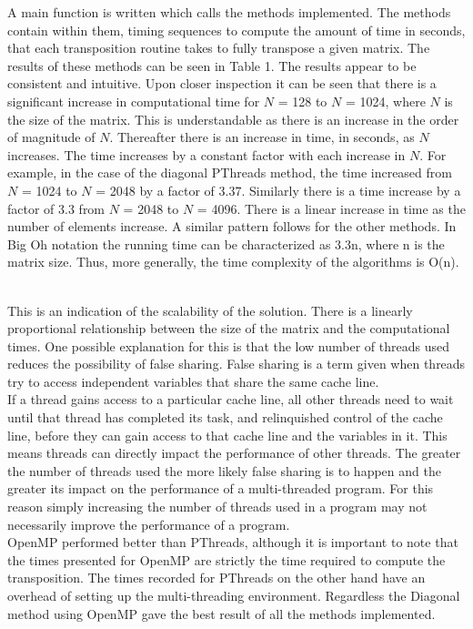 \documentclass[a4paper, 11pt, onecolumn, conference]{IEEEtran}      %
\begin{document}
A main function is written which calls the methods implemented. The methods contain within them, timing sequences to compute the amount of time in seconds, that each transposition routine takes to fully transpose a given matrix. The results of these methods can be seen in Table 1. The results appear to be consistent and intuitive. Upon closer inspection it can be seen that there is a significant increase in computational time for $N$ = 128 to $N$ = 1024, where $N$ is the size of the matrix. This is understandable as there is an increase in the order of magnitude of $N$. Thereafter there is an increase in time, in seconds, as $N$ increases. The time increases by a constant factor with each increase in $N$. For example, in the case of the diagonal PThreads method, the time increased from $N$ = 1024 to $N$ = 2048 by a factor of 3.37. Similarly there is a time increase by a factor of 3.3 from $N$ = 2048 to $N$ = 4096. There is a linear increase in time as the number of elements increase. A similar pattern follows for the other methods. In Big Oh notation the running time can be characterized as 3.3n, where n is the matrix size. Thus, more generally, the time complexity of the algorithms is O(n). \

This is an indication of the scalability of the solution. There is a linearly proportional relationship between the size of the matrix and the computational times. One possible explanation for this is that the low number of threads used reduces the possibility of false sharing. False sharing is a term given when threads try to access independent variables that share the same cache line\cite{thompson_2011}.\\

If a thread gains access to a particular cache line, all other threads need to wait until that thread has completed its task, and relinquished control of the cache line, before they can gain access to that cache line and the variables in it. This means threads can directly impact the performance of other threads. The greater the number of threads used the more likely false sharing is to happen and the greater its impact on the performance of a multi-threaded program. For this reason simply increasing the number of threads used in a program may not necessarily improve the performance of a program.\\

OpenMP performed better than PThreads, although it is important to note that the times presented for OpenMP are strictly the time required to compute the transposition. The times recorded for PThreads on the other hand have an overhead of setting up the multi-threading environment. Regardless the Diagonal method using OpenMP gave the best result of all the methods implemented.
\end{document}
